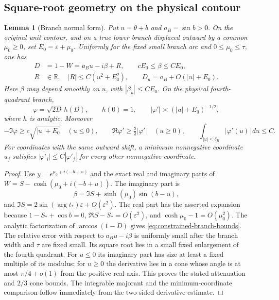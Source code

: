 \documentclass[11pt]{article}
\numberwithin{equation}{section}
\newtheorem{lemma}[theorem]{Lemma}
\theoremstyle{remark}\newtheorem{remark}[theorem]{Remark}
\begin{document}
\subsection{Square-root geometry on the physical contour}
\begin{lemma}[Branch normal form]\label{lem:constrained-branch-geometry}
Put $u=\theta+b$ and $a_B=\sin b>0$.  On the original unit
contour, and on a true lower branch displaced outward by a common
$\mu_0\ge0$, set $E_0=\varepsilon+\mu_0$.  Uniformly for the fixed
small branch arc and $0\le \mu_0\le\tau$, one has
\[
 \begin{aligned}
 D&=1-W=a_Bu-i\beta+R,\qquad cE_0\le\beta\le CE_0,\\
 R&\in\mathbb R,\quad |R|\le C(u^2+E_0^2),\qquad
 D_u=a_B+O(|u|+E_0).
 \end{aligned}
\]
Here $\beta$ may depend smoothly on $u$, with
$|\beta_u|\le CE_0$.  On the physical fourth-quadrant branch,
\begin{equation}\label{eq:constrained-branch-bounds}
 \varphi=\sqrt{2D}\,h(D),\qquad h(0)=1,
 \qquad |\varphi'|\asymp(|u|+E_0)^{-1/2},
\end{equation}
where $h$ is analytic.  Moreover
\[
 -\Im\varphi\ge c\sqrt{|u|+E_0}\quad(u\le0),\qquad
 \Re\varphi'\ge\tfrac23|\varphi'|\quad(u\ge0),\qquad
 \int_{|u|\le\delta_B}|\varphi'(u)|\,du\le C.
\]
For coordinates with the same outward shift, a minimum nonnegative
coordinate $u_j$ satisfies $|\varphi'_i|\le C|\varphi'_j|$
for every other nonnegative coordinate.

\end{lemma}
\begin{proof}
Use $y=e^{\mu_0+i(-b+u)}$ and the exact real and imaginary parts of
$W=S-\cosh(\mu_0+i(-b+u))$.  The imaginary part is
\[
 \beta=\Im S+\sinh(\mu_0)\sin(b-u),
\]
and $\Im S=2\sin(\arg t_*)\varepsilon+O(\varepsilon^2)$.
The real part has the asserted expansion because
$1-S_*+\cos b=0$, $\Re S-S_*=O(\varepsilon^2)$, and
$\cosh \mu_0-1=O(\mu_0^2)$.  The analytic factorization of
$\arccos(1-D)$ gives \eqref{eq:constrained-branch-bounds}.
The relative error with respect to $a_Bu-i\beta$ is uniformly
small after the branch width and $\tau$ are fixed small.  Its
square root lies in a small fixed enlargement of the fourth quadrant.
For $u\le0$
its imaginary part has size at least a fixed multiple of its modulus;
for $u\ge0$ the derivative lies in a cone whose angle is at most
$\pi/4+o(1)$ from the positive real axis.  This proves the stated
attenuation and $2/3$ cone bounds.  The integrable majorant and the
minimum-coordinate comparison follow immediately from the two-sided
derivative estimate.

\end{proof}
\end{document}
